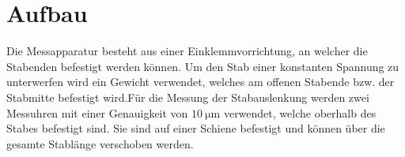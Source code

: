 \section{Aufbau}
\label{sec:Aufbau}
Die Messapparatur besteht aus einer Einklemmvorrichtung, an welcher die Stabenden befestigt werden können.
Um den Stab einer konstanten Spannung zu unterwerfen wird ein Gewicht verwendet,
 welches am offenen Stabende bzw. der Stabmitte befestigt wird.Für die Messung
  der Stabauslenkung werden zwei Messuhren mit einer Genauigkeit von
   $\SI{10}{\micro\meter}$ verwendet, welche oberhalb des Stabes befestigt sind.
   Sie sind auf einer Schiene befestigt und können über die gesamte Stablänge
    verschoben werden.
